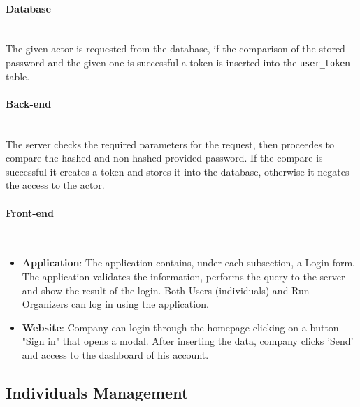 \paragraph{Database} \mbox{}\\ 
The given actor is requested from the database, if the comparison of the stored password and the given one is successful a token is inserted into the \texttt{user\_token} table.

\paragraph{Back-end} \mbox{}\\ 
The server checks the required parameters for the request, then proceedes to compare the hashed and non-hashed provided password. If the compare is successful it creates a token and stores it into the database, otherwise it negates the access to the actor.

\paragraph{Front-end} \mbox{}\\

\begin{itemize}
    \item \textbf{Application}: The application contains, under each subsection, a Login form. The application validates the information, performs the query to the server and show the result of the login. Both Users (individuals) and Run Organizers can log in using the application.
    \item \textbf{Website}: Company can login through the homepage clicking on a button "Sign in" that opens a modal. After inserting the data, company clicks 'Send' and access to the dashboard of his account.
\end{itemize}

\subsection{Individuals Management}

